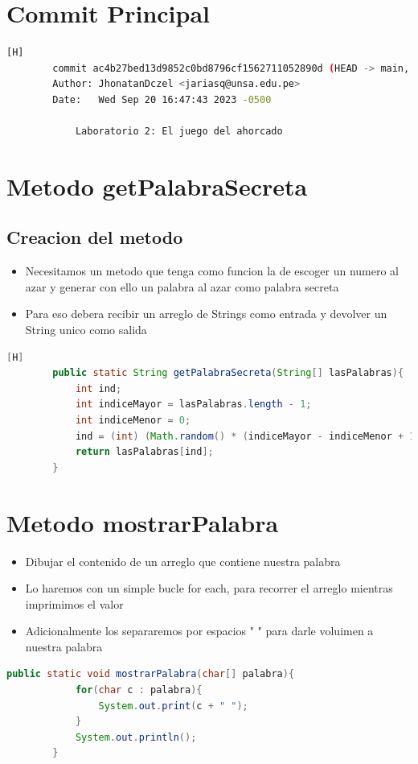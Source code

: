 \documentclass{article}
\begin{document}
	\section{Commit Principal}
	\begin{lstlisting}[language=bash,caption={Commit principal, sacado de git log}][H]
        commit ac4b27bed13d9852c0bd8796cf1562711052890d (HEAD -> main, origin/main)
        Author: JhonatanDczel <jariasq@unsa.edu.pe>
        Date:   Wed Sep 20 16:47:43 2023 -0500
        
            Laboratorio 2: El juego del ahorcado

	\end{lstlisting}
	\section{Metodo getPalabraSecreta}
	
	\subsection{Creacion del metodo}
	\begin{itemize}	
		\item Necesitamos un metodo que tenga como funcion la de escoger un numero al azar y generar con ello un palabra al azar como palabra secreta
		\item Para eso debera recibir un arreglo de Strings como entrada y devolver un String unico como salida
	\end{itemize}	
		
	\begin{lstlisting}[language=java,caption={Metodo getPalabraSecreta}][H]
        public static String getPalabraSecreta(String[] lasPalabras){
            int ind;
            int indiceMayor = lasPalabras.length - 1;
            int indiceMenor = 0;
            ind = (int) (Math.random() * (indiceMayor - indiceMenor + 1)) + indiceMenor;
            return lasPalabras[ind];
        }
	\end{lstlisting}

    
        \section{Metodo mostrarPalabra}
	\begin{itemize}
		\item Dibujar el contenido de un arreglo que contiene nuestra palabra
            \item Lo haremos con un simple bucle for each, para recorrer el arreglo mientras imprimimos el valor
            \item Adicionalmente los separaremos por espacios " " para darle voluimen a nuestra palabra
	\end{itemize}		
        \begin{lstlisting}[language=java, caption={Creando un nuevo atributo para Soldado}]
        public static void mostrarPalabra(char[] palabra){
            for(char c : palabra){
                System.out.print(c + " ");
            }
            System.out.println();
        }
        \end{lstlisting}
\end{document}
